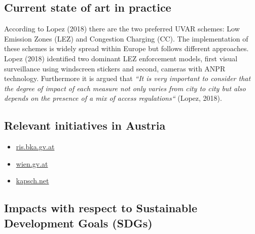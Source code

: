 \documentclass[
]{book}
\providecommand{\tightlist}{%
  \setlength{\itemsep}{0pt}\setlength{\parskip}{0pt}}
\begin{document}
\hypertarget{current-state-of-art-in-practice-5}{%
\subsection*{Current state of art in practice}\label{current-state-of-art-in-practice-5}}

According to Lopez (2018) there are the two preferred UVAR schemes: Low Emission Zones (LEZ) and Congestion Charging (CC). The implementation of these schemes is widely spread within Europe but follows different approaches. Lopez (2018) identified two dominant LEZ enforcement models, first visual surveillance using windscreen stickers and second, cameras with ANPR technology. Furthermore it is argued that \emph{``It is very important to consider that the degree of impact of each measure not only varies from city to city but also depends on the presence of a mix of access regulations``} (Lopez, 2018).

\hypertarget{relevant-initiatives-in-austria-5}{%
\subsection*{Relevant initiatives in Austria}\label{relevant-initiatives-in-austria-5}}

\begin{itemize}
\tightlist
\item
  \href{https://www.ris.bka.gv.at/GeltendeFassung.wxe?Abfrage=LrW\&Gesetzesnummer=20000270}{ris.bka.gv.at}
\item
  \href{https://www.wien.gv.at/ma22-lgb/luftgi.htm}{wien.gv.at}
\item
  \href{https://www.kapsch.net/ktc/its-solutions/urban-access-management/access-restriction/}{kapsch.net}
\end{itemize}

\hypertarget{impacts-with-respect-to-sustainable-development-goals-sdgs-5}{%
\subsection*{Impacts with respect to Sustainable Development Goals (SDGs)}\label{impacts-with-respect-to-sustainable-development-goals-sdgs-5}}
\end{document}
